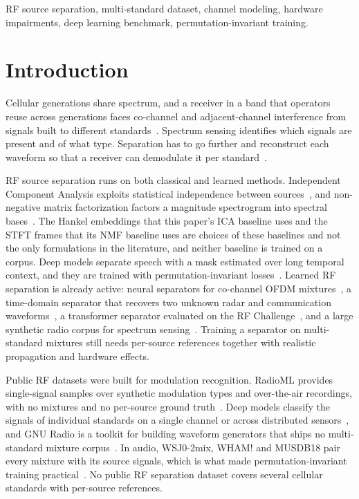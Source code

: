 \documentclass[journal]{IEEEtran}
\begin{document}
\begin{IEEEkeywords}
RF source separation, multi-standard dataset, channel modeling, hardware
impairments, deep learning benchmark, permutation-invariant training.
\end{IEEEkeywords}

\section{Introduction}

Cellular generations share spectrum, and a receiver in a band that operators
reuse across generations faces co-channel and adjacent-channel interference from
signals built to different standards~\cite{andrews2014what}. Spectrum sensing
identifies which
signals are present and of what type. Separation has to go further and
reconstruct each waveform so that a receiver can demodulate it per
standard~\cite{axell2012sensing,goldsmith2009breaking}.

RF source separation runs on both classical and learned methods. Independent
Component Analysis exploits statistical independence between
sources~\cite{hyvarinen2000ica}, and non-negative matrix factorization
factors a magnitude spectrogram into spectral
bases~\cite{fevotte2011nmf}. The Hankel embeddings that this paper's ICA
baseline uses and the STFT frames that its NMF baseline uses are choices of
these baselines and not the only formulations in the literature, and neither
baseline is trained on a corpus. Deep models separate speech with a mask
estimated over long temporal
context, and they are trained with permutation-invariant
losses~\cite{luo2019conv,luo2020dual,kolbaek2017multitalker}. Learned RF
separation is already active: neural separators for co-channel OFDM
mixtures~\cite{lee2023neural}, a time-domain separator that recovers two
unknown radar and communication waveforms~\cite{hinderer2025radar}, a
transformer separator evaluated on the RF Challenge~\cite{lifar2026rf}, and a
large synthetic radio corpus for spectrum sensing~\cite{chang2025csrd}. Training a
separator on multi-standard mixtures still needs per-source references together
with realistic propagation and hardware effects.

Public RF datasets were built for modulation recognition. RadioML provides
single-signal samples over synthetic modulation types and over-the-air
recordings, with no mixtures and no per-source ground
truth~\cite{oshea2016radio,oshea2016convolutional,oshea2018over}. Deep models
classify the signals of individual standards on a single channel or across
distributed sensors~\cite{rajendran2018deep}, and GNU Radio is a toolkit for
building waveform generators that ships no multi-standard mixture
corpus~\cite{blossom2004gnu}.
In audio, WSJ0-2mix, WHAM! and MUSDB18 pair every mixture with its source
signals, which is what made permutation-invariant training
practical~\cite{hershey2016deep,wichern2019wham,rafii2017musdb18}. No public RF
separation dataset covers several cellular standards with per-source
references.
\end{document}
